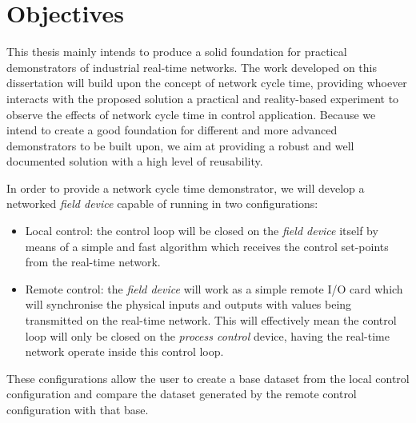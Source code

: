 \section{Objectives} \label{sec:objectives}

This thesis mainly intends to produce a solid foundation for practical demonstrators of industrial real-time networks. The work developed on this dissertation will build upon the concept of network cycle time, providing whoever interacts with the proposed solution a practical and reality-based experiment to observe the effects of network cycle time in control application. Because we intend to create a good foundation for different and more advanced demonstrators to be built upon, we aim at providing a robust and well documented solution with a high level of reusability.

In order to provide a network cycle time demonstrator, we will develop a networked \emph{field device} capable of running in two configurations:

\begin{itemize}
	\item Local control: the control loop will be closed on the \emph{field device} itself by means of a simple and fast algorithm which receives the control set-points from the real-time network.
	\item Remote control: the \emph{field device} will work as a simple remote I/O card which will synchronise the physical inputs and outputs with values being transmitted on the real-time network. This will effectively mean the control loop will only be closed on the \emph{process control} device, having the real-time network operate inside this control loop.
\end{itemize}

These configurations allow the user to create a base dataset from the local control configuration and compare the dataset generated by the remote control configuration with that base.